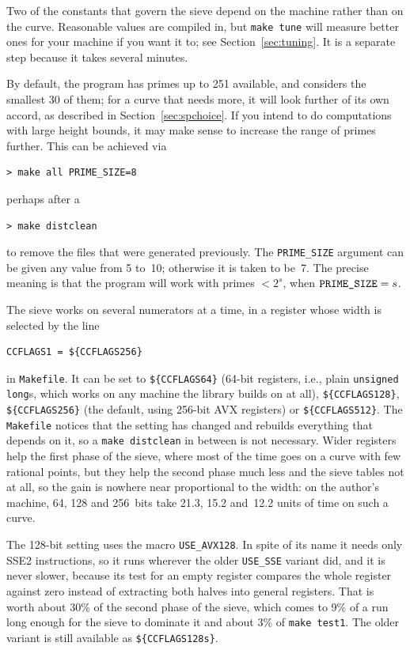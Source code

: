 \documentclass[12pt,a4paper,oneside]{amsart}
\begin{document}
Two of the constants that govern the sieve depend on the machine rather than
on the curve. Reasonable values are compiled in, but \texttt{make tune} will
measure better ones for your machine if you want it to; see
Section~\ref{sec:tuning}. It is a separate step because it takes several
minutes.

By default, the program has primes up to 251 available, and considers the
smallest $30$ of them; for a curve that needs more, it will look further of
its own accord, as described in Section~\ref{sec:spchoice}. If you intend to
do computations with large height bounds, it may make sense to increase the
range of primes further. This can be achieved via

\begin{verbatim}
> make all PRIME_SIZE=8
\end{verbatim}

perhaps after a

\begin{verbatim}
> make distclean
\end{verbatim}

to remove the files that were generated previously. The \texttt{PRIME\_SIZE}
argument can be given any value from 5 to~10; otherwise it is taken to be~7.
The precise meaning is that the program will work with primes $< 2^s$,
when $\text{\texttt{PRIME\_SIZE}} = s$.

The sieve works on several numerators at a time, in a register whose width is
selected by the line
\begin{verbatim}
CCFLAGS1 = ${CCFLAGS256}
\end{verbatim}
in \texttt{Makefile}. It can be set to \verb+${CCFLAGS64}+ (64-bit
registers, i.e., plain \texttt{unsigned long}s, which works on any machine
the library builds on at all), \verb+${CCFLAGS128}+,
\verb+${CCFLAGS256}+ (the default, using 256-bit AVX registers) or
\verb+${CCFLAGS512}+. The \texttt{Makefile} notices that the setting has
changed and rebuilds everything that depends on it, so a \texttt{make
distclean} in between is not necessary. Wider
registers help the first phase of the sieve, where most of the time goes on a
curve with few rational points, but they help the second phase much less and
the sieve tables not at all, so the gain is nowhere near proportional to the
width: on the author's machine, 64, 128 and 256~bits take 21.3, 15.2
and~12.2 units of time on such a curve.

The 128-bit setting uses the macro \verb+USE_AVX128+. In spite of its name it
needs only SSE2 instructions, so it runs wherever the older \verb+USE_SSE+
variant did, and it is never slower, because its test for an empty register
compares the whole register against zero instead of extracting both halves
into general registers. That is worth about 30\% of the second phase of the
sieve, which comes to 9\% of a run long enough for the sieve to dominate it
and about 3\% of \texttt{make test1}. The older variant is still available as
\verb+${CCFLAGS128s}+.
\end{document}

